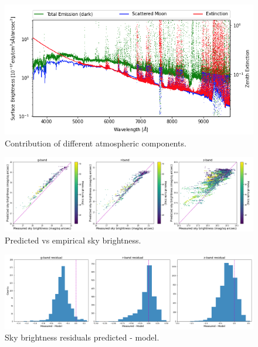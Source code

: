 \begin{figure}[h]
\centering
\includegraphics[width=16cm]{images/specsim/atmosphere_am_1.38_moon_zenith_63.28_sep_angle_53.24_moon_phase_0.45.png}
\caption{Contribution of different atmospheric components.}
\label{fig:atm_components}
\end{figure}

\begin{figure}[h]
\centering
\includegraphics[width=18cm]{images/specsim/moon_brightness.png}
\caption{Predicted vs empirical sky brightness.}
\label{fig:sb_comparison}
\end{figure}

\begin{figure}[h]
\centering
\includegraphics[width=16cm]{images/specsim/sky_brightness_residuals.png}
\caption{Sky brightness residuals predicted - model.}
\label{fig:sb_res}
\end{figure}


